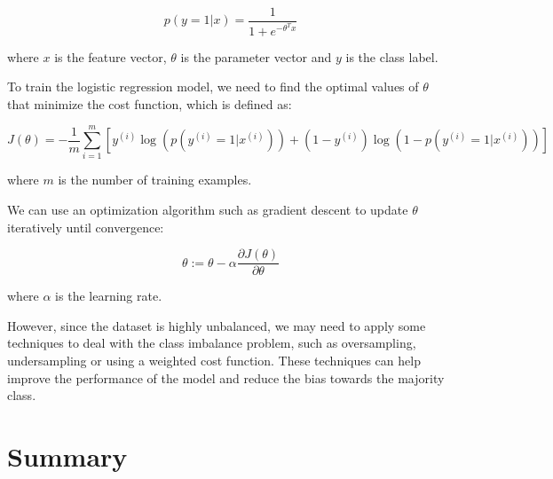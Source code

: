 \[p(y=1|x) = \frac{1}{1+e^{-\theta^Tx}}\]

where $x$ is the feature vector, $\theta$ is the parameter vector and $y$ is the class label.

To train the logistic regression model, we need to find the optimal values of $\theta$ that minimize the cost function, which is defined as:

\[J(\theta) = -\frac{1}{m}\sum_{i=1}^m[y^{(i)}\log(p(y^{(i)}=1|x^{(i)}))+(1-y^{(i)})\log(1-p(y^{(i)}=1|x^{(i)}))]\]

where $m$ is the number of training examples.

We can use an optimization algorithm such as gradient descent to update $\theta$ iteratively until convergence:

\[\theta := \theta - \alpha \frac{\partial J(\theta)}{\partial \theta}\]

where $\alpha$ is the learning rate.

However, since the dataset is highly unbalanced, we may need to apply some techniques to deal with the class imbalance problem, such as oversampling, undersampling or using a weighted cost function. These techniques can help improve the performance of the model and reduce the bias towards the majority class.






\section{Summary}







